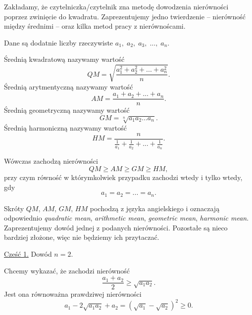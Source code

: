 

\noindent
Zakładamy, że czytelniczka/czytelnik zna metodę dowodzenia nierówności poprzez zwinięcie do kwadratu. Zaprezentujemy jedno twierdzenie -- nierówność między średnimi -- oraz kilka metod pracy z nierównoścami.

\vspace{10px}


\noindent
Dane są dodatnie liczby rzeczywiste $a_1,\; a_2, \; a_3, \; ..., \; a_n$.

\noindent
Średnią kwadratową nazywamy wartość
\[
    QM = \sqrt{\frac{a_1^2 + a_2^2 + ... + a_n^2}{n}}.
\]
Średnią arytmentyczną nazywamy wartość
\[
    AM = \frac{a_1 + a_2 + ... + a_n}{n}.
\]
Średnią geometryczną nazywamy wartość
\[
    GM = \sqrt[n]{a_1a_2...a_n}.
\]
Średnią harmoniczną nazywamy wartość
\[
   HM = \frac{n}{\frac{1}{a_1} + \frac{1}{a_2} + ... + \frac{1}{a_n}}.
\]

\noindent
Wówczas zachodzą nierówności
\[
    QM \geqslant AM \geqslant GM \geqslant HM,
\]
przy czym równość w którymkolwiek przypadku zachodzi wtedy i tylko wtedy, gdy
\[
    a_1 = a_2 = ... = a_n.
\]

\vspace{10px}
\noindent
Skróty $QM$, $AM$, $GM$, $HM$ pochodzą z języka angielskiego i oznaczają odpowiednio \textit{quadratic mean}, \textit{arithmetic mean}, \textit{geometric mean}, \textit{harmonic mean}. Zaprezentujemy dowód jednej z podanych nierówności. Pozostałe są nieco bardziej złożone, więc nie będziemy ich przytaczać.

\vspace{10px}


\noindent
\underline{Cześć 1.} Dowód $n = 2$.

\vspace{10px}

\noindent
Chcemy wykazać, że zachodzi nierówność
\[
    \frac{a_1 + a_2}{2} \geqslant \sqrt{a_1a_2}.
\]
Jest ona równoważna prawdziwej nierówności
\[
    a_1 - 2\sqrt{a_1a_2} + a_2 = (\sqrt{a_1} - \sqrt{a_2})^2 \geqslant 0.
\]

